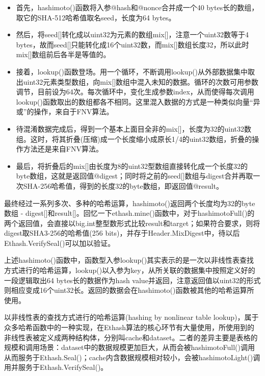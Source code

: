 \documentclass[UTF8]{ctexart}
\begin{document}
\begin{itemize}

\item 首先，hashimoto()函数将入参@hash和@nonce合并成一个40 bytes长的数组，取它的SHA-512哈希值取名seed，长度为64 bytes。

\item 然后，将seed[]转化成以uint32为元素的数组mix[]，注意一个uint32数等于4 bytes，故而seed[]只能转化成16个uint32数，而mix[]数组长度32，所以此时mix[]数组前后各半是等值的。

\item 接着，lookup()函数登场。用一个循环，不断调用lookup()从外部数据集中取出uint32元素类型数组，向mix[]数组中混入未知的数据。循环的次数可用参数调节，目前设为64次。每次循环中，变化生成参数index，从而使得每次调用lookup()函数取出的数组都各不相同。这里混入数据的方式是一种类似向量“异或”的操作，来自于FNV算法。

\item 待混淆数据完成后，得到一个基本上面目全非的mix[]，长度为32的uint32数组。这时，将其折叠(压缩)成一个长度缩小成原长1/4的uint32数组，折叠的操作方法还是来自FNV算法。

\item 最后，将折叠后的mix[]由长度为8的uint32型数组直接转化成一个长度32的byte数组，这就是返回值@digest；同时将之前的seed[]数组与digest合并再取一次SHA-256哈希值，得到的长度32的byte数组，即返回值@result。
\end{itemize}

最终经过一系列多次、多种的哈希运算，hashimoto()返回两个长度均为32的byte数组 - digest[]和result[]。回忆一下ethash.mine()函数中，对于hashimotoFull()的两个返回值，会直接以big.int整型数形式比较result和target；如果符合要求，则将digest取SHA3-256的哈希值(256 bits)，并存于Header.MixDigest中，待以后Ethash.VerifySeal()可以加以验证。


上述hashimoto()函数中，函数型入参lookup()其实表示的是一次以非线性表查找方式进行的哈希运算，lookup()以入参为key，从所关联的数据集中按照定义好的一段逻辑取出64 bytes长的数据作为hash value并返回，注意返回值以uint32的形式则相应变成16个uint32长。返回的数据会在hashimoto()函数被其他的哈希运算所使用。

以非线性表的查找方式进行的哈希运算(hashing by nonlinear table lookup)，属于众多哈希函数中的一种实现，在Ethash算法的核心环节有大量使用，所使用到的非线性表被定义成两种结构体，分别叫cache{}和dataset{}。二者的差异主要是表格的规模和调用场景：dataset{}中的数据规模更加巨大，从而会被hashimotoFull()调用从而服务于Ethash.Seal()；cache{}内含数据规模相对较小，会被hashimotoLight()调用并服务于Ethash.VerifySeal()。
\end{document}
